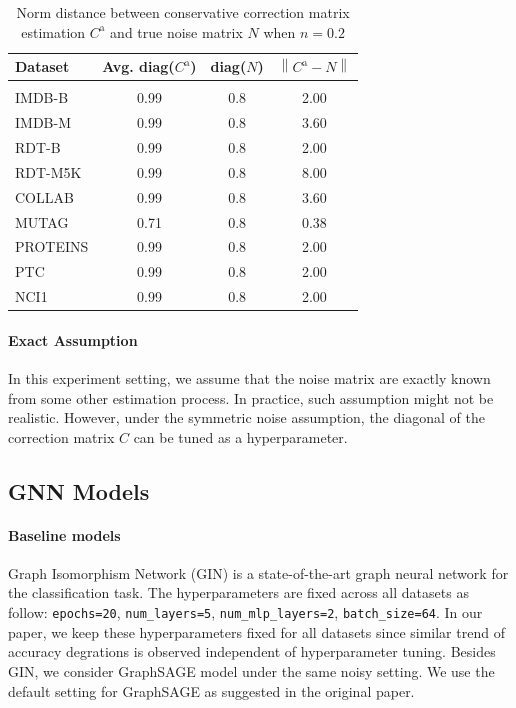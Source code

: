 \documentclass[letterpaper]{article}
\newcommand{\norm}[1]{\left\lVert#1\right\rVert}
\begin{document}
\begin{table}[h]
\caption{Norm distance between conservative correction matrix estimation
$C^{\text{a}}$ and true noise matrix $N$ when $n=0.2$}
\label{t:anchor_exact}
\begin{center}
\begin{tabular}{l|ccc}
\bf Dataset & Avg. diag($C^{\text{a}}$) & diag($N$) & $\norm{C^{\text{a}}-N}$ \\
\hline \\
IMDB-B   & 0.99 & 0.8 & 2.00 \\   
IMDB-M   & 0.99 & 0.8 & 3.60 \\ 
RDT-B    & 0.99 & 0.8 & 2.00 \\    
RDT-M5K  & 0.99 & 0.8 & 8.00 \\       
COLLAB   & 0.99 & 0.8 & 3.60 \\     
MUTAG    & 0.71 & 0.8 & 0.38 \\    
PROTEINS & 0.99 & 0.8 & 2.00 \\       
PTC      & 0.99 & 0.8 & 2.00 \\  
NCI1     & 0.99 & 0.8 & 2.00 \\   
\end{tabular}
\end{center}
\end{table}

\paragraph{Exact Assumption} In this experiment setting, we assume that the 
noise matrix are exactly known from some other estimation process. In practice,
such assumption might not be realistic. However, under the symmetric noise assumption,
the diagonal of the correction matrix $C$ can be tuned as a hyperparameter.

\subsection{GNN Models}

\paragraph{Baseline models} Graph Isomorphism Network (GIN) \cite{gin}
is a state-of-the-art graph neural network for the classification task. The
hyperparameters are fixed across all datasets as follow: \texttt{epochs=20}, 
\texttt{num\_layers=5}, \texttt{num\_mlp\_layers=2}, \texttt{batch\_size=64}.
In our paper, we keep these hyperparameters fixed for all datasets since similar 
trend of accuracy degrations is observed independent of hyperparameter tuning. 
Besides GIN, we consider GraphSAGE model \cite{graphsage} under the same noisy 
setting. We use the default setting for GraphSAGE as suggested in the original paper.
\end{document}

